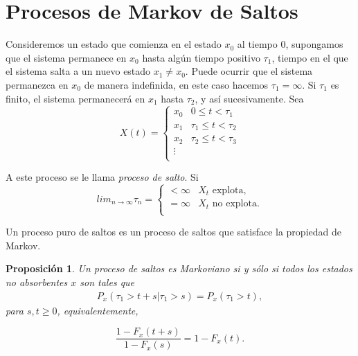 \documentclass{article}
\newtheorem{Prop}{Proposición}[section]
\numberwithin{equation}{section}
\begin{document}
\section{Procesos de Markov de Saltos}
Consideremos un estado que comienza en el estado $x_{0}$ al tiempo $0$, supongamos que el sistema permanece en $x_{0}$ hasta alg\'un tiempo positivo $\tau_{1}$, tiempo en el que el sistema salta a un nuevo estado $x_{1}\neq x_{0}$. Puede ocurrir que el sistema permanezca en $x_{0}$ de manera indefinida, en este caso hacemos $\tau_{1}=\infty$. Si $\tau_{1}$ es finito, el sistema permanecer\'a en $x_{1}$ hasta $\tau_{2}$, y as\'i sucesivamente.
Sea
\begin{equation}
X\left(t\right)=\left\{\begin{array}{cc}
x_{0} & 0\leq t<\tau_{1}\\
x_{1} & \tau_{1}\leq t<\tau_{2}\\
x_{2} & \tau_{2}\leq t<\tau_{3}\\
\vdots &\\
\end{array}\right.
\end{equation}

A este proceso  se le llama {\em proceso de salto}. Si
\begin{equation}
lim_{n\rightarrow\infty}\tau_{n}=\left\{\begin{array}{cc}
<\infty & X_{t}\textrm{ explota,}\\
=\infty & X_{t}\textrm{ no explota.}\\
\end{array}\right.
\end{equation}

Un proceso puro de saltos es un proceso de saltos que satisface la propiedad de Markov.

\begin{Prop}
Un proceso de saltos es Markoviano si y s\'olo si todos los estados no absorbentes $x$ son tales que
\begin{eqnarray*}
P_{x}\left(\tau_{1}>t+s|\tau_{1}>s\right)=P_{x}\left(\tau_{1}>t\right),
\end{eqnarray*}
para $s,t\geq0$, equivalentemente,

\begin{equation}\label{Eq.5}
\frac{1-F_{x}\left(t+s\right)}{1-F_{x}\left(s\right)}=1-F_{x}\left(t\right).
\end{equation}
\end{Prop}
\end{document}
